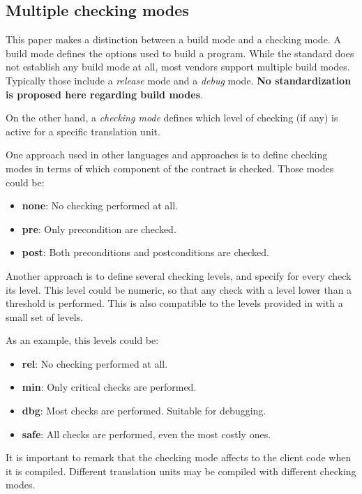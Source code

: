 \subsection{Multiple checking modes}

This paper makes a distinction between a build mode and a checking mode. A build
mode defines the options used to build a program. While the standard does not
establish any build mode at all, most vendors support multiple build modes.
Typically those include a \emph{release} mode and a \emph{debug} mode. \textbf{No
standardization is proposed here regarding build modes}.

On the other hand, a \emph{checking mode} defines which level of checking (if any) is
active for a specific translation unit.

One approach used in other languages and approaches is to define checking modes
in terms of which component of the contract is checked.
Those modes could be:

\begin{itemize}
  \item \textbf{none}: No checking performed at all.
  \item \textbf{pre}: Only precondition are checked.
  \item \textbf{post}: Both preconditions and postconditions are checked.
\end{itemize}

Another approach is to define several checking levels, and specify for every
check its level. This level could be numeric, so that any check with a level
lower than a threshold is performed. This is also compatible to the levels
provided in \cite{n4253} with a small set of levels. 

As an example, this levels could be:

\begin{itemize}
  \item \textbf{rel}: No checking performed at all.
  \item \textbf{min}: Only critical checks are performed.
  \item \textbf{dbg}: Most checks are performed. Suitable for debugging.
  \item \textbf{safe}: All checks are performed, even the most costly ones.
\end{itemize}

It is important to remark that the checking mode affects to the client code when
it is compiled. Different translation units may be compiled with different
checking modes.

